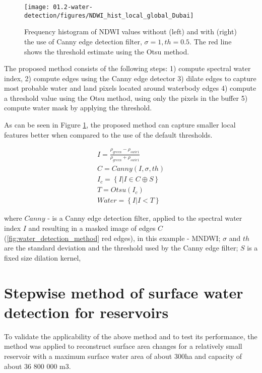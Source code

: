 \begin{figure}
	\centering
	\texttt{[image: 01.2-water-detection/figures/NDWI\_hist\_local\_global\_Dubai]}
	\caption{Frequency histogram of \gls{NDWI} values without (left) and with (right) the use of Canny edge detection filter, $\sigma=1, th=0.5$. The red line shows the threshold estimate using the Otsu method.}
	\label{fig:water_detection_method_local_water_hist_Dubai}
\end{figure}

The proposed method consists of the following steps: 1) compute spectral water index, 2) compute edges using the Canny edge detector 3) dilate edges to capture most probable water and land pixels located around waterbody edges 4) compute a threshold value using the Otsu method, using only the pixels in the buffer 5) compute water mask by applying the threshold.

As can be seen in Figure \ref{fig:water_detection_method_local_water_hist_Dubai}, the proposed method can capture smaller local features better when compared to the use of the default thresholds.


\begin{gather}
I=\frac{\rho_{green}-\rho_{swir1}}{\rho_{green}+\rho_{swir1}} \\
C=Canny(I,\sigma,th) \\
I_c=\left\{ I | I \in C \oplus S \right\} \\
T=Otsu(I_c) \\
Water = \left\{ I | I < T \right\}
\end{gather}


where $Canny$ - is a Canny edge detection filter, applied to the spectral water index $I$ and resulting in a masked image of edges $C$ (\ref{fig:water_detection_method} red edges), in this example - \gls{MNDWI}; $\sigma$ and $th$ are the standard deviation and the threshold used by the Canny edge filter; $S$ is a fixed size dilation kernel, 

\section{Stepwise method of surface water detection for reservoirs}

To validate the applicability of the above method and to test its performance, the method was applied to reconstruct surface area changes for a relatively small reservoir with a maximum surface water area of about 300ha and capacity of about 36 800 000 m3. 

